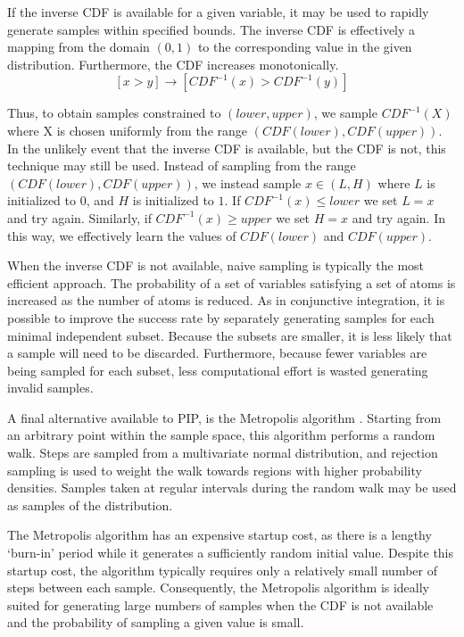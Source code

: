 If the inverse  CDF is available for a given variable,  it may be used
to rapidly generate samples  within specified bounds.  The inverse CDF
is effectively a mapping from  the domain $(0,1)$ to the corresponding
value  in  the given  distribution.   Furthermore,  the CDF  increases
monotonically.
$$[x > y] \rightarrow \left[CDF^{-1}(x) > CDF^{-1}(y)\right]$$

Thus, to obtain samples constrained  to  $(lower, upper)$, we
sample  $CDF^{-1}(X)$  where X  is  chosen  uniformly  from the  range
$(CDF(lower), CDF(upper))$.   In the  unlikely event that  the inverse
CDF is  available, but  the CDF  is not, this  technique may  still be
used.  Instead of sampling  from the range $(CDF(lower), CDF(upper))$,
we instead sample  $x \in (L,H)$ where $L$ is  initialized to $0$, and
$H$ is initialized to $1$.  If $CDF^{-1}(x) \leq lower$ we set $L = x$
and try again.  Similarly, if $CDF^{-1}(x)  \geq upper$ we set $H = x$
and  try again.   In  this way,  we  effectively learn  the values  of
$CDF(lower)$ and $CDF(upper)$.

When the inverse CDF is not available, naive sampling is typically the
most  efficient  approach.  The  probability  of  a  set of  variables
satisfying  a set  of atoms  is increased  as the  number of  atoms is
reduced.  As in conjunctive integration, it is possible to improve the
success  rate  by  separately  generating  samples  for  each  minimal
independent  subset.  Because  the  subsets are  smaller,  it is  less
likely that a sample will  need to be discarded.  Furthermore, because
fewer variables are being  sampled for each subset, less computational
effort is wasted generating invalid samples.

A final alternative available to PIP, is the
Metropolis  algorithm \cite{metropolis}.   Starting from  an arbitrary
point within the sample space,  this algorithm performs a random walk.
Steps  are  sampled  from  a  multivariate  normal  distribution,  and
rejection sampling  is used  to weight the  walk towards  regions with
higher  probability  densities.  Samples  taken  at regular  intervals
during the random walk may be used as samples of the distribution.

The Metropolis algorithm has an  expensive startup cost, as there is a
lengthy  `burn-in' period  while  it generates  a sufficiently  random
initial  value.  Despite  this startup  cost, the  algorithm typically
requires only a relatively small  number of steps between each sample.
Consequently,   the  Metropolis  algorithm   is  ideally   suited  for
generating large numbers of samples  when the CDF is not available and
the probability of sampling a given value is small.


